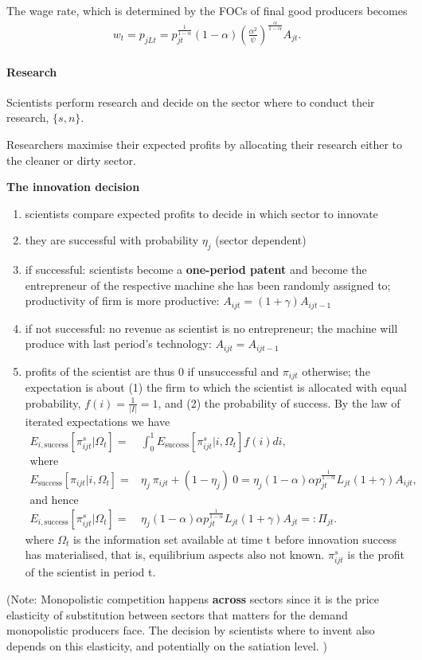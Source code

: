 \documentclass[12pt]{article}
\begin{document}
The wage rate, which is determined by the FOCs of final good producers becomes
\begin{align*}
w_t=p_{jLt}= p_{jt}^{\frac{1}{1-\alpha}}(1-\alpha)\left(\frac{\alpha^2}{\psi}\right)^\frac{\alpha}{1-\alpha}A_{jt}.
\end{align*}
\paragraph{Research}
Scientists perform research and decide on the sector where to conduct their research, $\{s,n\}$. 

Researchers maximise their expected profits by allocating their research either to the cleaner or dirty sector. 

\textbf{The innovation decision}
\begin{enumerate}
\item scientists compare expected profits to decide in which sector to innovate
\item they are successful with probability $\eta_j$ (sector dependent)
\item if successful: scientists become a \textbf{one-period patent} and become the entrepreneur of the respective machine she has been randomly assigned to; productivity of firm is more productive: $A_{ijt}=(1+\gamma)A_{ijt-1}$
\item if not successful: no revenue as scientist is no entrepreneur; the machine will produce with last period's  technology: $A_{ijt}=A_{ijt-1}$
\item profits of the scientist are thus 0 if unsuccessful and $\pi_{ijt}$ otherwise; the expectation is about (1) the firm to which the scientist is allocated with equal probability, $f(i)=\frac{1}{|I|}=1$, and (2) the probability of success. By the law of iterated expectations we have
\begin{align*}
E_{i,\text{success}}[\pi^s_{ijt}| \Omega_t]=& \int_{0}^{1}E_\text{success}[\pi^s_{ijt}|i, \Omega_t]f(i)di,\\ \text{where}&\\
E_\text{success}[\pi_{ijt}|i, \Omega_t]=& \eta_j\  \pi_{ijt}+(1-\eta_j)\ 0=\eta_j (1-\alpha)\alpha p_{jt}^\frac{1}{1-\alpha}L_{jt}(1+\gamma)A_{ijt},\\
\text{and hence}&\\
E_{i,\text{success}}[\pi^s_{ijt}| \Omega_t]=&\eta_j (1-\alpha)\alpha p_{jt}^\frac{1}{1-\alpha}L_{jt}(1+\gamma)A_{jt}=: \Pi_{jt}.
\end{align*}
where $\Omega_t$ is the information set available at time t before innovation success has materialised, that is, equilibrium aspects also not known. $\pi^s_{ijt}$ is the profit of the scientist in period t. 

\end{enumerate}
(Note: Monopolistic competition happens \textbf{across} sectors since it is the price elasticity of substitution between sectors that matters for the demand monopolistic producers face.
The decision by scientists where to invent also depends on this elasticity, and potentially on the satiation level. 
)
\end{document}
